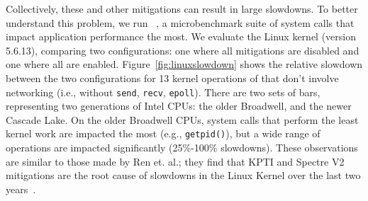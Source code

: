 Collectively, these and other mitigations can result in large
slowdowns. To better understand this problem, we run
\bench~\cite{lebench}, a microbenchmark suite of system calls
that impact application
performance the most.  We evaluate the Linux kernel (version 5.6.13),
comparing two configurations: one where all mitigations are disabled
and one where all are enabled. Figure~\ref{fig:linuxslowdown} shows
the relative slowdown between the two configurations for 13 kernel
operations of \bench that don't involve networking (i.e., without
\texttt{send}, \texttt{recv}, \texttt{epoll}).  There are two sets of
bars, representing two generations of Intel CPUs: the older Broadwell,
and the newer Cascade Lake.  On the older Broadwell CPUs,
system calls that perform the least kernel work are impacted the most
(e.g., \texttt{getpid()}), but a wide range of operations are impacted
significantly (25\%-100\% slowdowns). These observations are similar
to those made by Ren et. al.; they find that KPTI and Spectre V2
mitigations are the root cause of slowdowns in the Linux
Kernel over the last two years~\cite{lebench}.



